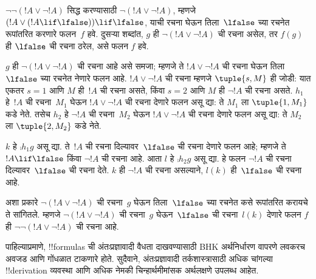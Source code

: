 \documentclass[../../../include/open-logic-section]{subfiles}
\begin{document}
\begin{ex}
$\lnot \lnot (!A \lor \lnot !A)$ सिद्ध करण्यासाठी
$\lnot(!A \lor \lnot !A)$, म्हणजे $(!A
\lor (!A \lif \lfalse)) \lif \lfalse$, याची रचना
घेऊन तिला~$\lfalse$ च्या रचनेत रूपांतरित करणारे
फलन~$f$ हवे. दुसऱ्या शब्दांत, $g$ ही $\lnot(!A
\lor \lnot !A)$ ची रचना असेल, तर $f(g)$ ही
$\lfalse$ ची रचना ठरेल, असे फलन $f$ हवे.

$g$ ही $\lnot(!A \lor \lnot !A)$ ची रचना आहे असे
समजा; म्हणजे ते $!A \lor \lnot !A$ ची रचना घेऊन
तिला~$\lfalse$ च्या रचनेत नेणारे फलन आहे.
$!A \lor \lnot !A$ ची रचना म्हणजे $\tuple{s, M}$
ही जोडी: यात एकतर $s = 1$ आणि $M$ ही~$!A$ ची
रचना असते, किंवा $s = 2$ आणि $M$ ही $\lnot !A$
ची रचना असते. $h_1$ हे~$!A$ ची रचना~$M_1$ घेऊन
$!A \lor \lnot !A$ ची रचना देणारे फलन असू द्या:
ते $M_1$ ला $\tuple{1, M_1}$ कडे नेते. तसेच $h_2$
हे $\lnot !A$ ची रचना~$M_2$ घेऊन
$!A \lor \lnot !A$ ची रचना देणारे फलन असू द्या:
ते $M_2$ ला $\tuple{2, M_2}$ कडे नेते.

$k$ हे $\comp{h_1}{g}$ असू द्या. ते~$!A$ ची रचना
दिल्यावर~$\lfalse$ ची रचना देणारे फलन आहे; म्हणजे
ते~$!A \lif \lfalse$ किंवा $\lnot !A$ ची रचना
आहे. आता $l$ हे $\comp{h_2}{g}$ असू द्या. हे
फलन $\lnot !A$ ची रचना दिल्यावर~$\lfalse$ ची
रचना देते. $k$ ही $\lnot !A$ ची रचना असल्याने,
$l(k)$ ही~$\lfalse$ ची रचना आहे.

अशा प्रकारे $\lnot(!A \lor \lnot !A)$ ची
रचना~$g$ घेऊन तिला~$\lfalse$ च्या रचनेत कसे
रूपांतरित करायचे ते सांगितले. म्हणजे
$\lnot(!A \lor \lnot !A)$ ची रचना~$g$
घेऊन~$\lfalse$ ची रचना~$l(k)$ देणारे फलन $f$
ही $\lnot\lnot(!A \lor \lnot !A)$ ची रचना आहे.
\end{ex}

पाहिल्याप्रमाणे, !!{formula}s ची अंतःप्रज्ञावादी
वैधता दाखवण्यासाठी BHK अर्थनिर्धारण वापरणे लवकरच
अवजड आणि गोंधळात टाकणारे होते. सुदैवाने,
अंतःप्रज्ञावादी तर्कशास्त्रासाठी अधिक चांगल्या
!!{derivation} व्यवस्था आणि अधिक नेमकी
चिन्हार्थमीमांसक अर्थलक्षणे उपलब्ध आहेत.
\end{document}
